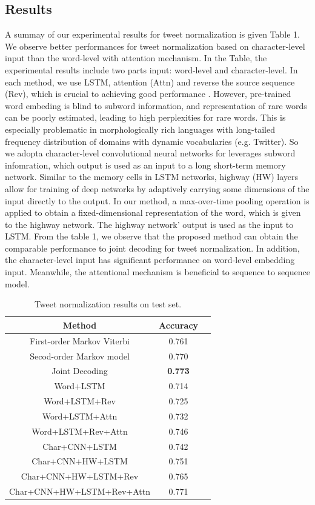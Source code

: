 \documentclass[letterpaper]{article}
\begin{document}
\subsection{Results}
A summay of our experimental results for tweet normalization is given Table 1. We observe better performances for tweet normalization based on character-level input than the word-level with attention mechanism. In the Table, the experimental results include two parts input: word-level and character-level. In each method, we use LSTM, attention (Attn) and reverse the source sequence (Rev), which is crucial to achieving good performance \cite{Sutskever:2014:SSL:2969033.2969173}. However, pre-trained word embeding is blind to subword information, and representation of rare words can be poorly estimated, leading to high perplexities for rare words. This is especially problematic in morphologically rich languages with long-tailed frequency distribution of domains with dynamic vocabularies (e.g. Twitter). So we adopta character-level convolutional neural networks for leverages subword infomration, which output is used as an input to a long short-term memory network. Similar to the memory cells in LSTM networks, highway (HW) layers allow for training of deep networks by adaptively carrying some dimensions of the input directly to the output. In our method, a max-over-time pooling operation is applied to obtain a fixed-dimensional representation of the word, which is given to the highway network. The highway network' output is used as the input to LSTM. From the table 1, we observe that the proposed method can obtain the comparable performance to joint decoding for tweet normalization. In addition, the character-level input has significant performance on word-level embedding input. Meanwhile, the attentional mechanism is beneficial to sequence to sequence model.
\begin{table}
	\begin{center}
		\begin{tabular}{| c | c | c | }
			\hline
			\bf Method & \bf Accuracy \\ \hline
			First-order Markov Viterbi & 0.761 \\ \hline
			Secod-order Markov model & 0.770 \\ \hline
			Joint Decoding & \textbf{0.773} \\ \hline
			Word+LSTM & 0.714 \\ \hline
			Word+LSTM+Rev & 0.725   \\ 
			\hline
			Word+LSTM+Attn & 0.732   \\ 
			\hline
			Word+LSTM+Rev+Attn & 0.746   \\ 
			\hline
			Char+CNN+LSTM & 0.742   \\ 
			\hline
			Char+CNN+HW+LSTM & 0.751   \\ 
			\hline
			Char+CNN+HW+LSTM+Rev & 0.765   \\ 
			\hline
			Char+CNN+HW+LSTM+Rev+Attn & 0.771 \\ 
			\hline
		\end{tabular}
		\caption{Tweet normalization results on test set.}
	\end{center}
\end{table}
\end{document}
